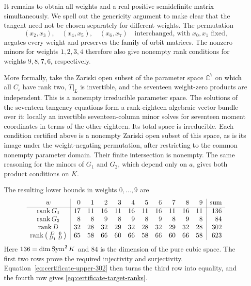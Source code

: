 It remains to obtain all weights and a real positive semidefinite
matrix simultaneously.  We spell out the genericity argument to
make clear that the tangent need not be chosen separately for
different weights.  The permutation
\[
 (x_2,x_3),\quad(x_4,x_5),\quad(x_6,x_7)
 \quad\text{interchanged, with }x_0,x_1\text{ fixed},
\]
negates every weight and preserves the family of orbit matrices.
The nonzero minors for weights $1,2,3,4$ therefore also give nonempty
rank conditions for weights $9,8,7,6$, respectively.

More formally, take the Zariski open subset of the parameter space
$\mathbb C^7$ on which all $C_i$ have rank two, $T|_L$ is
invertible, and the seventeen weight-zero products are independent.
This is a nonempty irreducible parameter space.  The solutions of
the seventeen tangency equations form a rank-eighteen algebraic
vector bundle over it: locally an invertible seventeen-column
minor solves for seventeen moment coordinates in terms of the
other eighteen.  Its total space is irreducible.  Each condition
certified above is a nonempty Zariski open subset of this space,
as is its image under the weight-negating permutation, after
restricting to the common nonempty parameter domain.  Their finite
intersection is nonempty.  The same reasoning for the minors of
$G_1$ and $G_2$, which depend only on $a$, gives both product
conditions on $K$.

The resulting lower bounds in weights $0,\ldots,9$ are
\begin{equation}
\begin{array}{c|rrrrrrrrrr|r}
w&0&1&2&3&4&5&6&7&8&9&\text{sum}\\\hline
\operatorname{rank} G_1&17&11&16&11&16&11&16&11&16&11&136\\
\operatorname{rank} G_2&8&8&9&8&9&8&9&8&9&8&84\\
\operatorname{rank} D&32&28&32&29&32&28&32&29&32&28&302\\
\operatorname{rank}\left(\begin{smallmatrix}D&0\\D_1&D\end{smallmatrix}\right)
 &65&58&66&60&66&58&66&60&66&58&623
\end{array}
\label{eq:certificate-rank-sums}
\end{equation}
Here $136=\dim\operatorname{Sym}^2K$ and $84$ is the dimension of the pure
cubic space.  The first two rows prove the required injectivity
and surjectivity.  Equation~\eqref{eq:certificate-upper-302}
then turns the third row into equality, and the fourth row gives
\eqref{eq:certificate-target-ranks}.


